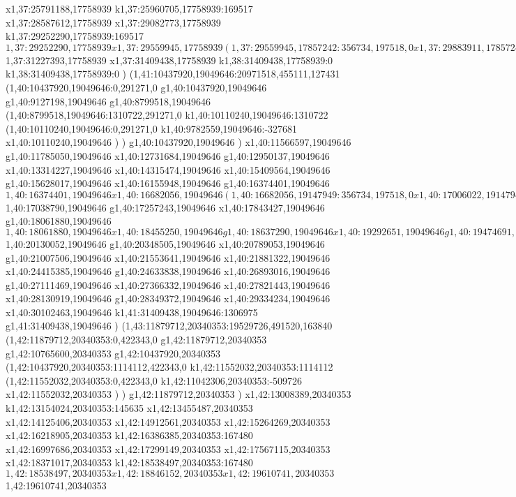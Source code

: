 {x1,37:25791188,17758939
k1,37:25960705,17758939:169517
x1,37:28587612,17758939
x1,37:29082773,17758939
k1,37:29252290,17758939:169517
$1,37:29252290,17758939
x1,37:29559945,17758939
(1,37:29559945,17857242:356734,197518,0
x1,37:29883911,17857242
)
k1,37:30098719,17758939:182040
x1,37:30535627,17758939
k1,37:30717667,17758939:182040
x1,37:31227393,17758939
$1,37:31227393,17758939
x1,37:31409438,17758939
k1,38:31409438,17758939:0
k1,38:31409438,17758939:0
)
(1,41:10437920,19049646:20971518,455111,127431
(1,40:10437920,19049646:0,291271,0
g1,40:10437920,19049646
g1,40:9127198,19049646
g1,40:8799518,19049646
(1,40:8799518,19049646:1310722,291271,0
k1,40:10110240,19049646:1310722
(1,40:10110240,19049646:0,291271,0
k1,40:9782559,19049646:-327681
x1,40:10110240,19049646
)
)
g1,40:10437920,19049646
)
x1,40:11566597,19049646
g1,40:11785050,19049646
x1,40:12731684,19049646
g1,40:12950137,19049646
x1,40:13314227,19049646
x1,40:14315474,19049646
x1,40:15409564,19049646
g1,40:15628017,19049646
x1,40:16155948,19049646
g1,40:16374401,19049646
$1,40:16374401,19049646
x1,40:16682056,19049646
(1,40:16682056,19147949:356734,197518,0
x1,40:17006022,19147949
)
$1,40:17038790,19049646
g1,40:17257243,19049646
x1,40:17843427,19049646
g1,40:18061880,19049646
$1,40:18061880,19049646
x1,40:18455250,19049646
g1,40:18637290,19049646
x1,40:19292651,19049646
g1,40:19474691,19049646
x1,40:20130052,19049646
$1,40:20130052,19049646
g1,40:20348505,19049646
x1,40:20789053,19049646
g1,40:21007506,19049646
x1,40:21553641,19049646
x1,40:21881322,19049646
x1,40:24415385,19049646
g1,40:24633838,19049646
x1,40:26893016,19049646
g1,40:27111469,19049646
x1,40:27366332,19049646
x1,40:27821443,19049646
x1,40:28130919,19049646
g1,40:28349372,19049646
x1,40:29334234,19049646
x1,40:30102463,19049646
k1,41:31409438,19049646:1306975
g1,41:31409438,19049646
)
(1,43:11879712,20340353:19529726,491520,163840
(1,42:11879712,20340353:0,422343,0
g1,42:11879712,20340353
g1,42:10765600,20340353
g1,42:10437920,20340353
(1,42:10437920,20340353:1114112,422343,0
k1,42:11552032,20340353:1114112
(1,42:11552032,20340353:0,422343,0
k1,42:11042306,20340353:-509726
x1,42:11552032,20340353
)
)
g1,42:11879712,20340353
)
x1,42:13008389,20340353
k1,42:13154024,20340353:145635
x1,42:13455487,20340353
x1,42:14125406,20340353
x1,42:14912561,20340353
x1,42:15264269,20340353
x1,42:16218905,20340353
k1,42:16386385,20340353:167480
x1,42:16997686,20340353
x1,42:17299149,20340353
x1,42:17567115,20340353
x1,42:18371017,20340353
k1,42:18538497,20340353:167480
$1,42:18538497,20340353
x1,42:18846152,20340353
x1,42:19610741,20340353
$1,42:19610741,20340353
}
